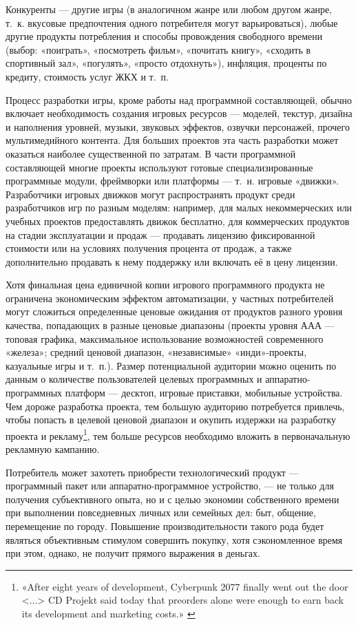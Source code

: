 \documentclass{article}
\begin{document}
Конкуренты — другие игры (в аналогичном жанре или любом другом жанре, т.~к. вкусовые предпочтения одного потребителя могут варьироваться), любые другие продукты потребления и способы провождения свободного времени (выбор: «поиграть», «посмотреть фильм», «почитать книгу», «сходить в спортивный зал», «погулять», «просто отдохнуть»), инфляция, проценты по кредиту, стоимость услуг ЖКХ и т.~п.

Процесс разработки игры, кроме работы над программной составляющей, обычно включает необходимость создания игровых ресурсов — моделей, текстур, дизайна и наполнения уровней, музыки, звуковых эффектов, озвучки персонажей, прочего мультимедийного контента. Для больших проектов эта часть разработки может оказаться наиболее существенной по затратам. В части программной составляющей многие проекты используют готовые специализированные программные модули, фреймворки или платформы — т.~н. игровые «движки». Разработчики игровых движков могут распространять продукт среди разработчиков игр по разным моделям: например, для малых некоммерческих или учебных проектов предоставлять движок бесплатно, для коммерческих продуктов на стадии эксплуатации и продаж — продавать лицензию фиксированной стоимости или на условиях получения процента от продаж, а также дополнительно продавать к нему поддержку или включать её в цену лицензии.

Хотя финальная цена единичной копии игрового программного продукта не ограничена экономическим эффектом автоматизации, у частных потребителей могут сложиться определенные ценовые ожидания от продуктов разного уровня качества, попадающих в разные ценовые диапазоны (проекты уровня ААА — топовая графика, максимальное использование возможностей современного «железа»; средний ценовой диапазон, «независимые» «инди»-проекты, казуальные игры и т.~п.). Размер потенциальной аудитории можно оценить по данным о количестве пользователей целевых программных и аппаратно-программных платформ — десктоп, игровые приставки, мобильные устройства. Чем дороже разработка проекта, тем большую аудиторию потребуется привлечь, чтобы попасть в целевой ценовой диапазон и окупить издержки на разработку проекта и рекламу\footnote{«After eight years of development, Cyberpunk 2077 finally went out the door <...> CD Projekt said today that preorders alone were enough to earn back its development and marketing costs.» \cite{cyberpunkProfit}}, тем больше ресурсов необходимо вложить в первоначальную рекламную кампанию.

Потребитель может захотеть приобрести технологический продукт — программный пакет или аппаратно-программное устройство, — не только для получения субъективного опыта, но и с целью экономии собственного времени при выполнении повседневных личных или семейных дел: быт, общение, перемещение по городу. Повышение производительности такого рода будет являться объективным стимулом совершить покупку, хотя сэкономленное время при этом, однако, не получит прямого выражения в деньгах.
\end{document}
